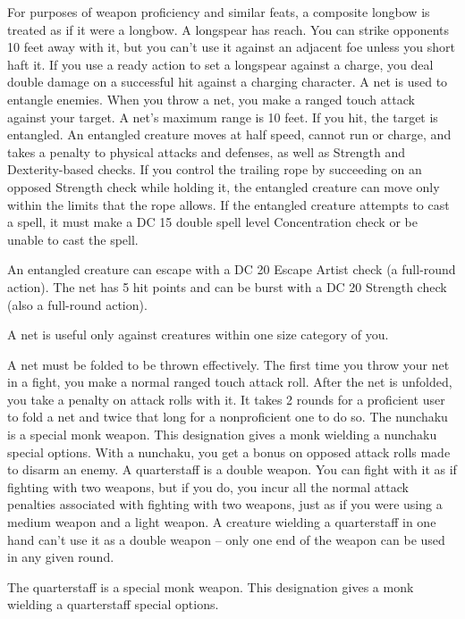 \par For purposes of weapon proficiency and similar feats, a composite longbow is treated as if it were a longbow.
 A longspear has reach. You can strike opponents 10 feet away with it, but you can't use it against an adjacent foe unless you short haft it. If you use a ready action to set a longspear against a charge, you deal double damage on a successful hit against a charging character.
 A net is used to entangle enemies. When you throw a net, you make a ranged touch attack against your target. A net's maximum range is 10 feet. If you hit, the target is entangled. An entangled creature moves at half speed, cannot run or charge, and takes a  penalty to physical attacks and defenses, as well as Strength and Dexterity-based checks. If you control the trailing rope by succeeding on an opposed Strength check while holding it, the entangled creature can move only within the limits that the rope allows. If the entangled creature attempts to cast a spell, it must make a DC 15 \add double spell level Concentration check or be unable to cast the spell.
\par An entangled creature can escape with a DC 20 Escape Artist check (a full-round action). The net has 5 hit points and can be burst with a DC 20 Strength check (also a full-round action).
\par A net is useful only against creatures within one size category of you.
\par A net must be folded to be thrown effectively. The first time you throw your net in a fight, you make a normal ranged touch attack roll. After the net is unfolded, you take a  penalty on attack rolls with it. It takes 2 rounds for a proficient user to fold a net and twice that long for a nonproficient one to do so.
 The nunchaku is a special monk weapon. This designation gives a monk wielding a nunchaku special options. With a nunchaku, you get a  bonus on opposed attack rolls made to disarm an enemy.
 A quarterstaff is a double weapon. You can fight with it as if fighting with two weapons, but if you do, you incur all the normal attack penalties associated with fighting with two weapons, just as if you were using a medium weapon and a light weapon. A creature wielding a quarterstaff in one hand can't use it as a double weapon -- only one end of the weapon can be used in any given round.
\par The quarterstaff is a special monk weapon. This designation gives a monk wielding a quarterstaff special options.
